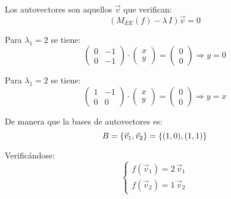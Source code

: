 \documentclass[a5paper,12pt,twoside]{book}
\begin{document}
\begin{mdframed}[style=MyFrame2]
    Los autovectores son aquellos $\Vec{v}$ que verifican:
    \begin{equation*}
        \left( M_{EE}(f) - \lambda \, I \right) \Vec{v} = 0
    \end{equation*}
    
    Para $\lambda_1=2$ se tiene:
    \begin{equation}
        \begin{pmatrix}
            0 & -1
            \\
            0 & -1
        \end{pmatrix}
        \cdot
        \begin{pmatrix}
            x
            \\
            y
        \end{pmatrix}
        =
        \begin{pmatrix}
            0
            \\
            0
        \end{pmatrix}
        \Rightarrow y=0
    \end{equation}
    
    Para $\lambda_1=2$ se tiene:
    \begin{equation}
        \begin{pmatrix}
            1 & -1
            \\
            0 & 0
        \end{pmatrix}
        \cdot
        \begin{pmatrix}
            x
            \\
            y
        \end{pmatrix}
        =
        \begin{pmatrix}
            0
            \\
            0
        \end{pmatrix}
        \Rightarrow y=x
    \end{equation}
    
    De manera que la bases de autovectores es:
    \begin{equation*}
        B = { \left\{ {\Vec{v}_1 , \Vec{v}_2} \right\} } = { \left\{ {(1,0),(1,1)} \right\} }
    \end{equation*}
    
    Verificándose:
    \begin{equation*}
        \left\{
        \begin{aligned}
            f(\Vec{v}_1) = 2 \, \Vec{v}_1
            \\
            f(\Vec{v}_2) = 1 \, \Vec{v}_2
        \end{aligned}
        \right.
    \end{equation*}
    

\end{mdframed}
\end{document}
